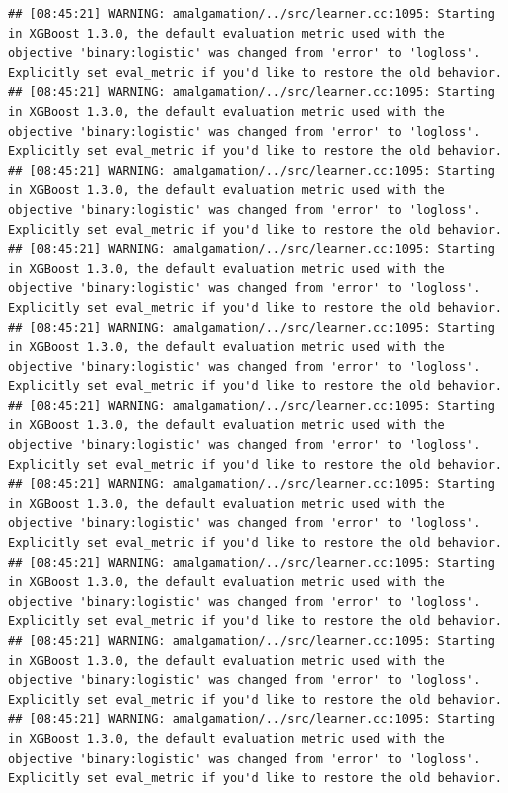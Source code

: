 \documentclass[
]{scrbook}
\begin{document}
\begin{verbatim}
## [08:45:21] WARNING: amalgamation/../src/learner.cc:1095: Starting in XGBoost 1.3.0, the default evaluation metric used with the objective 'binary:logistic' was changed from 'error' to 'logloss'. Explicitly set eval_metric if you'd like to restore the old behavior.
## [08:45:21] WARNING: amalgamation/../src/learner.cc:1095: Starting in XGBoost 1.3.0, the default evaluation metric used with the objective 'binary:logistic' was changed from 'error' to 'logloss'. Explicitly set eval_metric if you'd like to restore the old behavior.
## [08:45:21] WARNING: amalgamation/../src/learner.cc:1095: Starting in XGBoost 1.3.0, the default evaluation metric used with the objective 'binary:logistic' was changed from 'error' to 'logloss'. Explicitly set eval_metric if you'd like to restore the old behavior.
## [08:45:21] WARNING: amalgamation/../src/learner.cc:1095: Starting in XGBoost 1.3.0, the default evaluation metric used with the objective 'binary:logistic' was changed from 'error' to 'logloss'. Explicitly set eval_metric if you'd like to restore the old behavior.
## [08:45:21] WARNING: amalgamation/../src/learner.cc:1095: Starting in XGBoost 1.3.0, the default evaluation metric used with the objective 'binary:logistic' was changed from 'error' to 'logloss'. Explicitly set eval_metric if you'd like to restore the old behavior.
## [08:45:21] WARNING: amalgamation/../src/learner.cc:1095: Starting in XGBoost 1.3.0, the default evaluation metric used with the objective 'binary:logistic' was changed from 'error' to 'logloss'. Explicitly set eval_metric if you'd like to restore the old behavior.
## [08:45:21] WARNING: amalgamation/../src/learner.cc:1095: Starting in XGBoost 1.3.0, the default evaluation metric used with the objective 'binary:logistic' was changed from 'error' to 'logloss'. Explicitly set eval_metric if you'd like to restore the old behavior.
## [08:45:21] WARNING: amalgamation/../src/learner.cc:1095: Starting in XGBoost 1.3.0, the default evaluation metric used with the objective 'binary:logistic' was changed from 'error' to 'logloss'. Explicitly set eval_metric if you'd like to restore the old behavior.
## [08:45:21] WARNING: amalgamation/../src/learner.cc:1095: Starting in XGBoost 1.3.0, the default evaluation metric used with the objective 'binary:logistic' was changed from 'error' to 'logloss'. Explicitly set eval_metric if you'd like to restore the old behavior.
## [08:45:21] WARNING: amalgamation/../src/learner.cc:1095: Starting in XGBoost 1.3.0, the default evaluation metric used with the objective 'binary:logistic' was changed from 'error' to 'logloss'. Explicitly set eval_metric if you'd like to restore the old behavior.

\end{verbatim}
\end{document}
